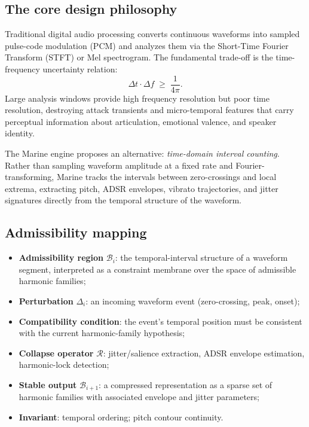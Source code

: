 \documentclass[12pt, a4paper]{article}
\theoremstyle{plain}
\theoremstyle{definition}
\theoremstyle{remark}
\newcommand{\Rcal}{\mathcal{R}}
\newcommand{\Bcal}{\mathcal{B}}
\begin{document}
\subsection{The core design philosophy}

Traditional digital audio processing converts continuous waveforms
into sampled pulse-code modulation (PCM) and analyzes them via the
Short-Time Fourier Transform (STFT) or Mel spectrogram.
The fundamental trade-off is the time-frequency uncertainty relation:
\[
  \Delta t \cdot \Delta f \;\geq\; \frac{1}{4\pi}.
\]
Large analysis windows provide high frequency resolution but poor
time resolution, destroying attack transients and micro-temporal
features that carry perceptual information about articulation,
emotional valence, and speaker identity.

The Marine engine proposes an alternative: \emph{time-domain interval
counting}.
Rather than sampling waveform amplitude at a fixed rate and
Fourier-transforming, Marine tracks the intervals between
zero-crossings and local extrema, extracting pitch, ADSR envelopes,
vibrato trajectories, and jitter signatures directly from the
temporal structure of the waveform.

\subsection{Admissibility mapping}

\begin{itemize}
  \item \textbf{Admissibility region} $\Bcal_i$: the temporal-interval
        structure of a waveform segment, interpreted as a constraint
        membrane over the space of admissible harmonic families;
  \item \textbf{Perturbation} $\Delta_i$: an incoming waveform event
        (zero-crossing, peak, onset);
  \item \textbf{Compatibility condition}: the event's temporal position
        must be consistent with the current harmonic-family hypothesis;
  \item \textbf{Collapse operator} $\Rcal$: jitter/salience extraction,
        ADSR envelope estimation, harmonic-lock detection;
  \item \textbf{Stable output} $\Bcal_{i+1}$: a compressed representation
        as a sparse set of harmonic families with associated envelope
        and jitter parameters;
  \item \textbf{Invariant}: temporal ordering; pitch contour continuity.
\end{itemize}
\end{document}
